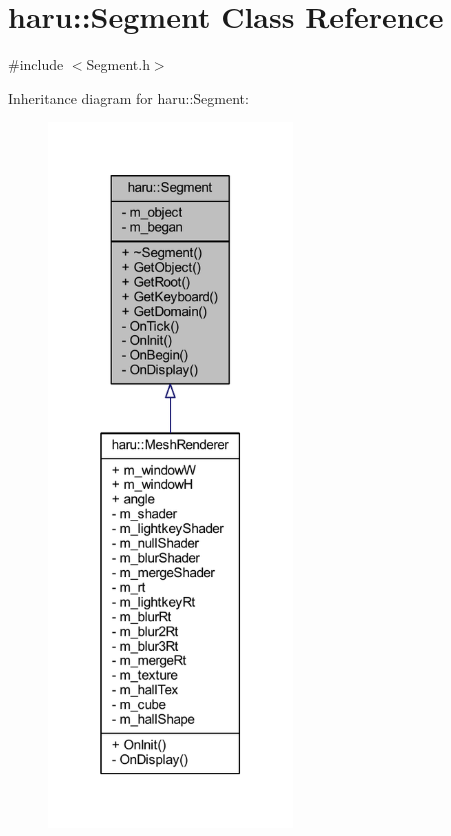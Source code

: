 \hypertarget{classharu_1_1_segment}{}\section{haru\+:\+:Segment Class Reference}
\label{classharu_1_1_segment}


{\ttfamily \#include $<$Segment.\+h$>$}



Inheritance diagram for haru\+:\+:Segment\+:\nopagebreak
\begin{figure}[H]
\begin{center}
\leavevmode
\includegraphics[width=184pt]{classharu_1_1_segment__inherit__graph}
\end{center}
\end{figure}


